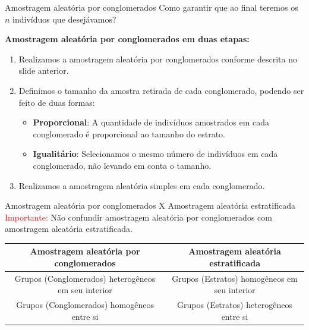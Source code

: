 \begin{frame}{Amostragem aleatória por conglomerados}
    Como garantir que ao final teremos os $n$ indivíduos que desejávamos?

    \pause

    \textbf{Amostragem aleatória por conglomerados em duas etapas: }
    \begin{enumerate}
        \item Realizamos a amostragem aleatória por conglomerados conforme descrita no slide anterior. 
        \item Definimos o tamanho da amostra retirada de cada conglomerado, podendo ser feito de duas formas:
        \begin{itemize}
            \item \textbf{Proporcional}: A quantidade de indivíduos amostrados em cada conglomerado é proporcional ao tamanho do estrato. 
            \item \textbf{Igualitário}:  Selecionamos o mesmo número de indivíduos em cada conglomerado, não levando em conta o tamanho. 
        \end{itemize}
        \item Realizamos a amostragem aleatória simples em cada conglomerado. 
    \end{enumerate}
\end{frame}
\begin{frame}{Amostragem aleatória por conglomerados X Amostragem aleatória estratificada}
    \textcolor{red}{Importante:} Não confundir amostragem aleatória por conglomerados com amostragem aleatória estratificada.
    \begin{table}[H]
    \centering
    \begin{adjustbox}{width=\textwidth}
    \begin{tabular}{|c|c|}
    \hline
    \textbf{Amostragem aleatória por conglomerados} & \textbf{Amostragem aleatória estratificada} \\\hline
    Grupos (Conglomerados) heterogêneos em seu interior & Grupos (Estratos) homogêneos em seu interior \\ \hline
    Grupos (Conglomerados) homogêneos entre si & Grupos (Estratos) heterogêneos entre si \\ \hline
    \end{tabular}
    \end{adjustbox}
    \end{table}
\end{frame}

